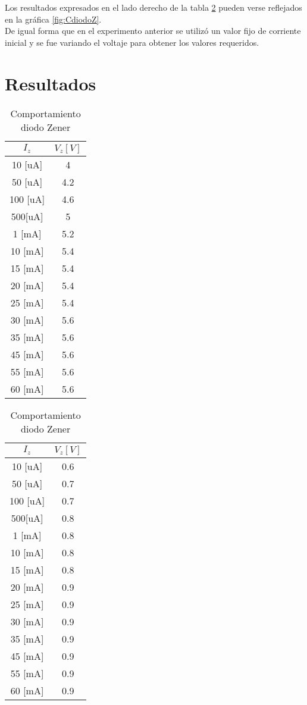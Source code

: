 Los resultados expresados en el lado derecho de la tabla \ref{zenerI} pueden verse reflejados en la gráfica \ref{fig:CdiodoZ}.\\

De igual forma que en el experimento anterior se utilizó un valor fijo de corriente inicial y se fue variando el voltaje para obtener los valores requeridos.\\

\section{Resultados}



\begin{table}[h!]
\centering
\begin{tabular}{|c|c|}
\hline
$I_z$           & $V_z [V]$  \\ \hline
10 {[}uA{]}  & 4   \\ \hline
50 {[}uA{]}  & 4.2 \\ \hline
100 {[}uA{]} & 4.6 \\ \hline
500{[}uA{]}  & 5   \\ \hline
1 {[}mA{]}   & 5.2 \\ \hline
10 {[}mA{]}  & 5.4 \\ \hline
15 {[}mA{]}  & 5.4 \\ \hline
20 {[}mA{]}  & 5.4 \\ \hline
25 {[}mA{]}  & 5.4 \\ \hline
30 {[}mA{]}  & 5.6 \\ \hline
35 {[}mA{]}  & 5.6 \\ \hline
45 {[}mA{]}  & 5.6 \\ \hline
55 {[}mA{]}  & 5.6 \\ \hline
60 {[}mA{]}  & 5.6 \\ \hline
\end{tabular}
\begin{tabular}{|c|c|}
\hline
$I_z$           & $V_z [V]$  \\ \hline
10 {[}uA{]}  & 0.6 \\ \hline
50 {[}uA{]}  & 0.7 \\ \hline
100 {[}uA{]} & 0.7 \\ \hline
500{[}uA{]}  & 0.8 \\ \hline
1 {[}mA{]}   & 0.8 \\ \hline
10 {[}mA{]}  & 0.8 \\ \hline
15 {[}mA{]}  & 0.8 \\ \hline
20 {[}mA{]}  & 0.9 \\ \hline
25 {[}mA{]}  & 0.9 \\ \hline
30 {[}mA{]}  & 0.9 \\ \hline
35 {[}mA{]}  & 0.9 \\ \hline
45 {[}mA{]}  & 0.9 \\ \hline
55 {[}mA{]}  & 0.9 \\ \hline
60 {[}mA{]}  & 0.9 \\ \hline
\end{tabular}

\caption{Comportamiento diodo Zener}
\label{zenerI}
\end{table}


